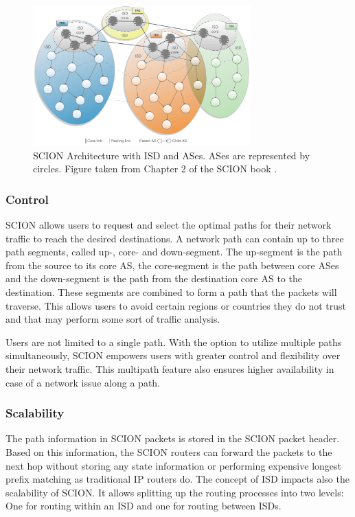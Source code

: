\begin{figure}[h]
    \centering
    \includegraphics[width=0.75\textwidth]{figures/scion_isd_architecture.png}
    \caption{SCION Architecture with ISD and ASes. ASes are represented by circles. Figure taken from Chapter 2 of the SCION book \cite{Perrig2022}.}
    \label{fig:scion_isd_architecture}
\end{figure}


\subsubsection{Control}

SCION allows users to request and select the optimal paths for their network traffic to reach the desired destinations.
A network path can contain up to three path segments, called up-, core- and down-segment.
The up-segment is the path from the source to its core AS, the core-segment is the path between core ASes and the down-segment is the path from the destination core AS to the destination.
These segments are combined to form a path that the packets will traverse.
This allows users to avoid certain regions or countries they do not trust and that may perform some sort of traffic analysis.

Users are not limited to a single path.
With the option to utilize multiple paths simultaneously, SCION empowers users with greater control and flexibility over their network traffic.
This multipath feature also ensures higher availability in case of a network issue along a path.


\subsubsection{Scalability}

The path information in SCION packets is stored in the SCION packet header.
Based on this information, the SCION routers can forward the packets to the next hop without storing any state information or performing expensive longest prefix matching as traditional IP routers do.
The concept of ISD impacts also the scalability of SCION.
It allows splitting up the routing processes into two levels:
One for routing within an ISD and one for routing between ISDs.


